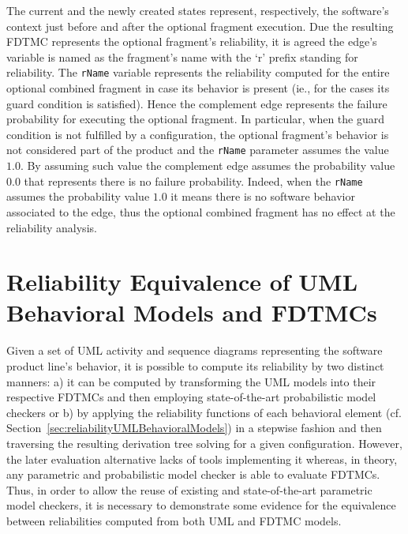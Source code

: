 The current and the newly created states represent, respectively, the software's
context just before and after the optional fragment execution. Due the resulting
FDTMC represents the optional fragment's reliability, it is agreed the edge's variable
is named as the fragment's name with the `r' prefix standing for reliability.
The \texttt{rName} variable represents the reliability computed for the entire
optional combined fragment in case its behavior is present (ie., for the cases
its guard condition is satisfied). Hence the complement edge represents the
failure probability for executing the optional fragment. In particular, when the
guard condition is not fulfilled by a configuration, the optional fragment's
behavior is not considered part of the product and the \texttt{rName} parameter
assumes the value $1.0$. By assuming such value the complement edge assumes the
probability value $0.0$ that represents there is no failure probability. Indeed,
when the \texttt{rName} assumes the probability value $1.0$ it means there is no
software behavior associated to the edge, thus the optional combined fragment has no effect at the reliability analysis.






\section{Reliability Equivalence of UML Behavioral Models and FDTMCs
	\label{sec:reliabilityEquivalenceUMLBehavioralModelsFDTMCs}}


Given a set of UML activity and sequence diagrams representing the  software
product line's behavior, it is possible to compute its reliability by two
distinct manners: a) it can be computed by transforming the UML models into
their respective FDTMCs and then employing state-of-the-art probabilistic model
checkers or b) by applying the reliability functions of each behavioral element
(cf.  Section~\ref{sec:reliabilityUMLBehavioralModels}) in a stepwise fashion
and then traversing the resulting derivation tree solving for a given
configuration.  However, the later evaluation alternative lacks of tools
implementing it whereas, in theory, any parametric and probabilistic model
checker is able to evaluate FDTMCs.  Thus, in order to allow the reuse of existing
and state-of-the-art parametric model checkers, it is necessary to demonstrate
some evidence for the equivalence between reliabilities computed from both UML
and FDTMC models.

